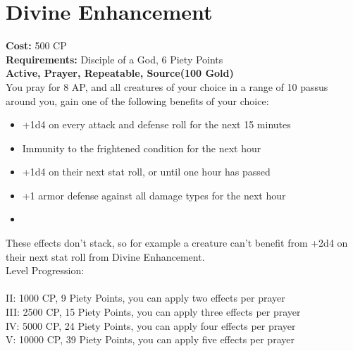\section{Divine Enhancement}
\textbf{Cost:} 500 CP\\
\textbf{Requirements:} Disciple of a God, 6 Piety Points \\
\textbf{Active, Prayer, Repeatable, Source(100 Gold)}\\
You pray for 8 AP, and all creatures of your choice in a range of 10 passus around you, gain one of the following benefits of your choice:
\begin{itemize}
	\item +1d4 on every attack and defense roll for the next 15 minutes
	\item Immunity to the frightened condition for the next hour
	\item +1d4 on their next stat roll, or until one hour has passed
	\item +1 armor defense against all damage types for the next hour
	\item 
\end{itemize}

These effects don't stack, so for example a creature can't benefit from +2d4 on their next stat roll from Divine Enhancement.\\

Level Progression:\\
\\
II: 1000 CP, 9 Piety Points, you can apply two effects per prayer\\
III: 2500 CP, 15 Piety Points, you can apply three effects per prayer\\
IV: 5000 CP, 24 Piety Points, you can apply four effects per prayer\\
V: 10000 CP, 39 Piety Points, you can apply five effects per prayer\\